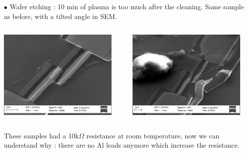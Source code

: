 \documentclass[handout]{beamer}
\begin{document}
\begin{frame}[allowframebreaks]
    $\bullet$ Wafer etching : 10 min of plasma is too much after the cleaning. Same sample as before, with a tilted angle in SEM.
       \vspace{0.5cm}
       \begin{columns}[onlytextwidth]
            \begin{column}{0.5\textwidth}
                \includegraphics[width=165pt]{tilt3.png}
            \end{column}
            
            \begin{column}{0.5\textwidth}
                \includegraphics[width=165pt]{tilt4.png}
            \end{column}
        \end{columns}
        
       These samples had a 10k$\Omega$ resistance at room temperature, now we can understand why : there are no Al leads anymore which increase the resistance.
    \end{frame}
    
\end{document}
